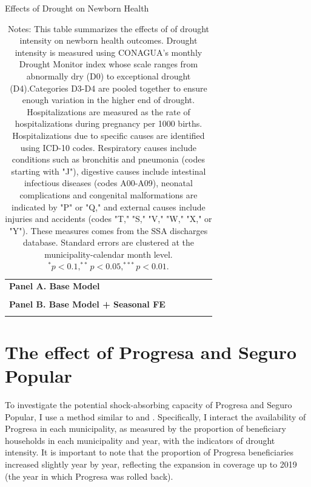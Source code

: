 \documentclass[12pt, oneside]{article}      %
\begin{document}
\begin{table}[!ht]
\centering
\caption{Effects of Drought on Newborn Health}\label{tab:hospital_drought}
\fontsize{10pt}{12pt}\selectfont
\begin{tabular}{lccccc}
\toprule
\textbf{Panel A. Base Model} & & & & & \\
 \\

\textbf{Panel B. Base Model + Seasonal FE} & & & & & \\
 \\
\bottomrule
\end{tabular}
\caption*{\footnotesize{Notes: This table summarizes the effects of of drought intensity on newborn health outcomes. Drought intensity is measured using CONAGUA's monthly Drought Monitor index whose scale ranges from abnormally dry (D0) to exceptional drought (D4).Categories D3-D4 are pooled together to ensure enough variation in the higher end of drought. Hospitalizations are measured as the rate of hospitalizations during pregnancy per 1000 births.  Hospitalizations due to specific causes are identified using ICD-10 codes. Respiratory causes include conditions such as bronchitis and pneumonia (codes starting with "J"), digestive causes include intestinal infectious diseases (codes A00-A09), neonatal complications and congenital malformations are indicated by "P" or "Q," and external causes include injuries and accidents (codes "T," "S," "V," "W," "X," or "Y"). These measures comes from the SSA discharges database. Standard errors are clustered at the municipality-calendar month level. $^* p<0.1, ^{**} p<0.05, ^{***} p<0.01$.}}
\end{table}


\clearpage
\newpage



\section{The effect of Progresa and Seguro Popular}

To investigate the potential shock-absorbing capacity of Progresa and Seguro Popular, I use a method similar to \cite{Barreca2016} and \cite{Cohen2022}. Specifically, I interact the availability of Progresa in each municipality, as measured by the proportion of beneficiary households in each municipality and year, with the indicators of drought intensity. It is important to note that the proportion of Progresa beneficiaries increased slightly year by year, reflecting the expansion in coverage up to 2019 (the year in which Progresa was rolled back).
\end{document}
